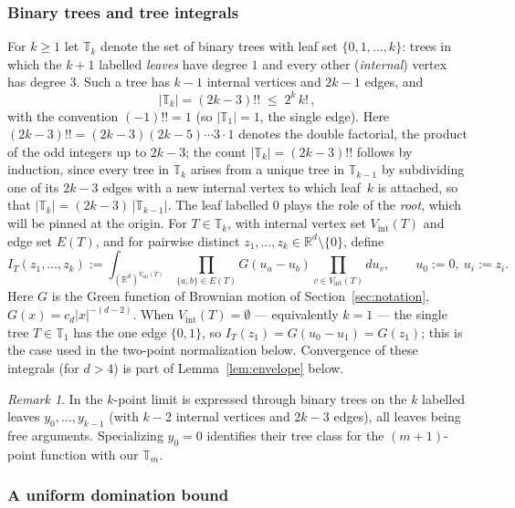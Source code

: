 \documentclass[11pt]{article}
\theoremstyle{definition}
\theoremstyle{remark}
\newtheorem{remark}[theorem]{Remark}
\newcommand{\R}{\mathbb{R}}
\newcommand{\T}{\mathbb{T}}                    %
\numberwithin{equation}{section}
\theoremstyle{plain}
\theoremstyle{definition}
\theoremstyle{remark}
\theoremstyle{plain}
\begin{document}
\subsubsection{Binary trees and tree integrals}\label{sec:treedef}

For $k\ge1$ let $\T_k$ denote the set of binary trees with leaf set
$\{0,1,\dots,k\}$: trees in which the $k+1$ labelled \emph{leaves} have
degree $1$ and every other (\emph{internal}) vertex has degree $3$. Such a
tree has $k-1$ internal vertices and $2k-1$ edges, and
\begin{equation}\label{eq:treecount}
|\T_k|=(2k-3)!!\;\le\;2^k\,k!\,,
\end{equation}
with the convention $(-1)!!=1$ (so $|\T_1|=1$, the single edge). Here $(2k-3)!!=(2k-3)(2k-5)\cdots3\cdot1$ denotes the double factorial, the product of the odd integers up to $2k-3$; the count $|\T_k|=(2k-3)!!$ follows by induction, since every tree in $\T_k$ arises from a unique tree in $\T_{k-1}$ by subdividing one of its $2k-3$ edges with a new internal vertex to which leaf~$k$ is attached, so that $|\T_k|=(2k-3)\,|\T_{k-1}|$. The leaf
labelled $0$ plays the role of the \emph{root}, which will be pinned at the
origin. For $T\in\T_k$, with internal vertex set $V_{\mathrm{int}}(T)$ and edge
set $E(T)$, and for pairwise distinct $z_1,\dots,z_k\in\R^d\setminus\{0\}$,
define
\begin{equation}\label{eq:IT}
I_T(z_1,\dots,z_k)
:=\int_{(\R^d)^{V_{\mathrm{int}}(T)}}
\prod_{\{a,b\}\in E(T)}G(u_a-u_b)
\prod_{v\in V_{\mathrm{int}}(T)} du_v,
\qquad u_0:=0,\ u_i:=z_i .
\end{equation}
Here $G$ is the Green function of Brownian motion of Section~\ref{sec:notation}, $G(x)=c_d|x|^{-(d-2)}$.
When $V_{\mathrm{int}}(T)=\emptyset$ --- equivalently $k=1$ --- the single tree $T\in\T_1$ has the one edge
$\{0,1\}$, so $I_T(z_1)=G(u_0-u_1)=G(z_1)$; this is the case used in the
two-point normalization below.
Convergence of these integrals (for $d>4$) is part of
Lemma~\ref{lem:envelope} below.

\begin{remark}\label{rem:treeconvention}
In \cite{CCHS26} the $k$-point limit is expressed through binary trees on
the $k$ labelled leaves $y_0,\dots,y_{k-1}$ (with $k-2$ internal vertices and
$2k-3$ edges), all leaves being free arguments. Specializing $y_0=0$
identifies their tree class for the $(m{+}1)$-point function with our
$\T_m$.
\end{remark}

\subsubsection{A uniform domination bound}
\end{document}
